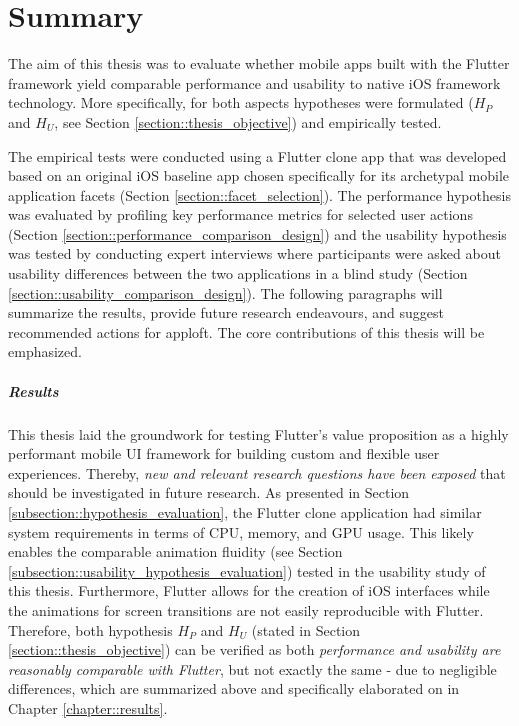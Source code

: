\chapter{Summary} \label{chapter::summary}
The aim of this thesis was to evaluate whether mobile apps built with the Flutter framework yield comparable performance and usability to native iOS framework technology.
More specifically, for both aspects hypotheses were formulated ($H_P$ and $H_U$, see Section \ref{section::thesis_objective}) and empirically tested.

The empirical tests were conducted using a Flutter clone app that was developed based on an original iOS baseline app chosen specifically for its archetypal mobile application facets (Section \ref{section::facet_selection}).
The performance hypothesis was evaluated by profiling key performance metrics for selected user actions (Section \ref{section::performance_comparison_design}) and the usability hypothesis was tested by conducting expert interviews where participants were asked about usability
differences between the two applications in a blind study (Section \ref{section::usability_comparison_design}).
The following paragraphs will summarize the results, provide future research endeavours, and suggest recommended actions for apploft.
The core contributions of this thesis will be emphasized.
\paragraph*{Results}

This thesis laid the groundwork for testing Flutter's value proposition as a highly performant mobile UI framework for building 
custom and flexible user experiences. Thereby, \emph{new and relevant research questions have been exposed} that should be investigated in future research.
As presented in Section \ref{subsection::hypothesis_evaluation}, the Flutter clone application had similar system requirements in terms of CPU, memory, and GPU usage. This likely enables the 
comparable animation fluidity (see Section \ref{subsection::usability_hypothesis_evaluation}) tested in the usability study of this thesis. Furthermore, Flutter allows for the creation of iOS interfaces while the animations for
screen transitions are not easily reproducible with Flutter. 
Therefore, both hypothesis $H_P$ and $H_U$ (stated in Section \ref{section::thesis_objective}) can be verified as both \emph{performance and usability are reasonably comparable with Flutter}, but not exactly the same - due to negligible differences, which are summarized above and specifically elaborated on in Chapter \ref{chapter::results}.
